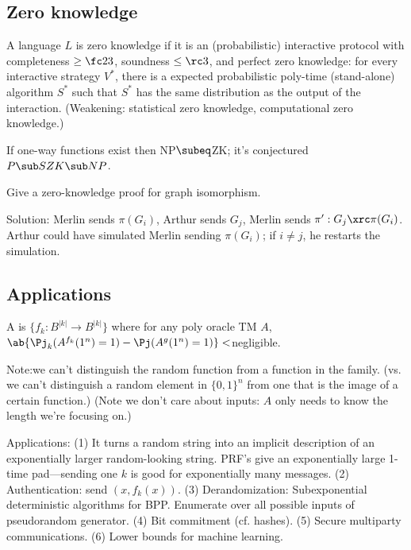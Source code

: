 \subsection{Zero knowledge}
\begin{df}
A language $L$ is zero knowledge if it is an (probabilistic) interactive protocol with completeness $\ge \fc 23$, soundness $\le \rc3$, and perfect zero knowledge: for every interactive strategy $V^*$, there is a expected probabilistic poly-time (stand-alone) algorithm $S^*$ such that $S^*$ has the same distribution as the output of the interaction. (Weakening: statistical zero knowledge, computational zero knowledge.)
\end{df}
If one-way functions exist then NP$\subeq$ZK; it's conjectured $P\sub SZK\sub NP$.

Give a zero-knowledge proof for graph isomorphism.

Solution: Merlin sends $\pi(G_i)$, Arthur sends $G_j$, Merlin sends $\pi':G_j\xrc \pi(G_i)$. Arthur could have simulated Merlin sending $\pi(G_i)$; if $i\ne j$, he restarts the simulation.

\subsection{Applications}
\begin{df}
A  is $\{f_k:B^{|k|}\to B^{|k|}\}$ where for any poly oracle TM $A$, $\ab{\Pj_k (A^{f_k}(1^n)=1)-\Pj(A^g(1^n)=1)}<$negligible. 
\end{df}
Note:we can't distinguish the random function from a function in the family. (vs. we can't distinguish a random element in $\{0,1\}^n$ from one that is the image of a certain function.) (Note we don't care about inputs: $A$ only needs to know the length we're focusing on.)

Applications: (1) It turns a random string into an implicit description of an exponentially larger random-looking string. PRF's give an exponentially large 1-time pad---sending one $k$ is good for exponentially many messages. (2) Authentication: send $(x,f_k(x))$. (3) Derandomization: Subexponential deterministic algorithms for BPP. Enumerate over all possible inputs of pseudorandom generator. (4) Bit commitment (cf. hashes). (5) Secure multiparty communications. (6) Lower bounds for machine learning.

